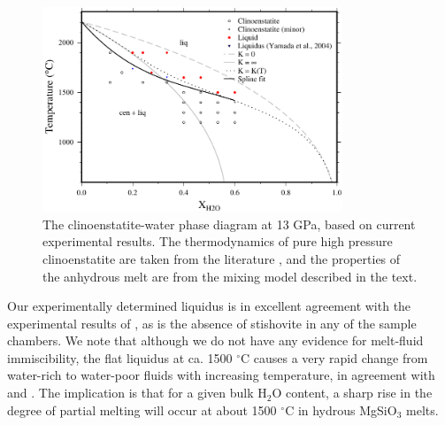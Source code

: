 \documentclass[review]{elsarticle}
\begin{document}
\begin{figure}[ht!]
  \centering
      \includegraphics[width=0.8\textwidth]{figures/enstatite}
  \caption{The clinoenstatite-water phase diagram at 13 GPa, based on current experimental results. The thermodynamics of pure high pressure clinoenstatite are taken from the literature \citep{SLB2011}, and the properties of the anhydrous melt are from the mixing model described in the text.}
  \label{fig:eoH}
\end{figure}

Our experimentally determined liquidus is in excellent agreement with the experimental results of \cite{YII2004}, as is the absence of stishovite in any of the sample chambers. We note that although we do not have any evidence for melt-fluid immiscibility, the flat liquidus at ca. 1500 $^{\circ}$C causes a very rapid change from water-rich to water-poor fluids with increasing temperature, in agreement with \cite{Inoue1994} and \cite{YII2004}. The implication is that for a given bulk H$_2$O content, a sharp rise in the degree of partial melting will occur at about 1500 $^{\circ}$C in hydrous MgSiO$_3$ melts.

\clearpage
\end{document}
